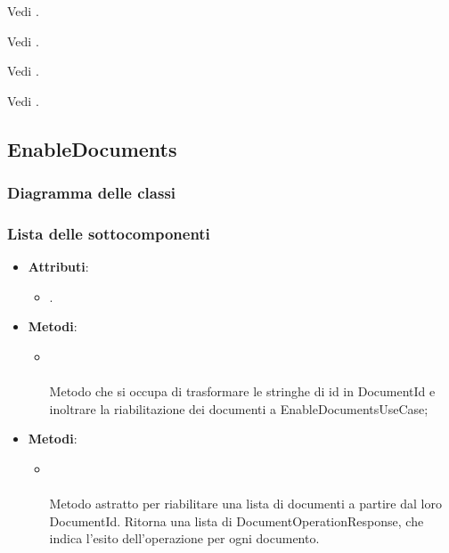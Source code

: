 \documentclass[10pt, a4paper]{article}
\begin{document}
Vedi .

Vedi .

Vedi .

Vedi .


\subsection{EnableDocuments}
\subsubsection{Diagramma delle classi}
\subsubsection{Lista delle sottocomponenti}

\label{EnableDocumentsControllerDettaglio}
\begin{itemize}
    \item \textbf{Attributi}:
    \begin{itemize}
        \item {}.
    \end{itemize}
    \item \textbf{Metodi}:
    \begin{itemize}
        \item {}\\ \\
        Metodo che si occupa di trasformare le stringhe di id in DocumentId e inoltrare la riabilitazione dei documenti a EnableDocumentsUseCase;
    \end{itemize}
\end{itemize}

\label{EnableDocumentsUseCaseDettaglio}
\begin{itemize}
    \item \textbf{Metodi}:
    \begin{itemize}
        \item {}\\ \\
        Metodo astratto per riabilitare una lista di documenti a partire dal loro DocumentId. Ritorna una lista di DocumentOperationResponse, che indica l'esito dell'operazione per ogni documento.
    \end{itemize}
\end{itemize}
\end{document}
